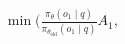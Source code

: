 \documentclass[preview]{standalone}
\begin{document}
\begin{align*}
\min \big(\frac{\pi_\theta(o_1 \mid q)}{\pi_{\theta_{\text{old}}}(o_1 \mid q)} A_1,
\end{align*}
\end{document}
